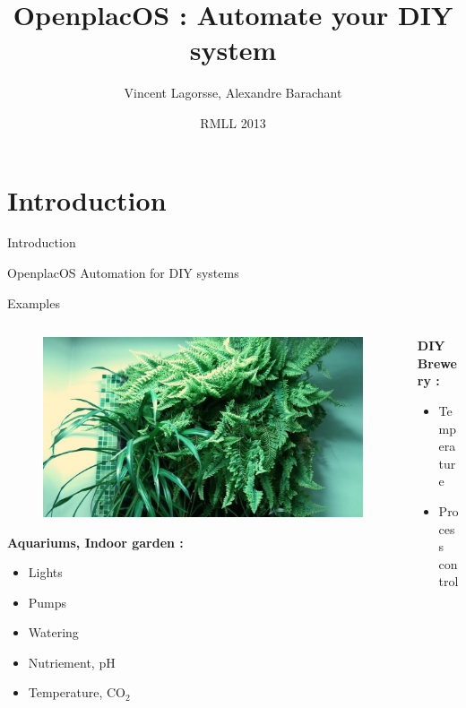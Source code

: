 \documentclass{beamer}
\title[P300 BCI without training]{OpenplacOS : Automate your DIY system}
\author[A. Barachant, V. Lagorsse]{Vincent Lagorsse, Alexandre Barachant}\institute{}
\date{RMLL 2013}
\begin{document}
{
\begin{frame}
  \titlepage
\end{frame}
}
\addtocounter{framenumber}{-1}

\section{Introduction}

\begin{frame}{Introduction}
\begin{block}{OpenplacOS}
Automation for DIY systems
\end{block}
\end{frame}

\begin{frame}{Examples}
\begin{columns}
\begin{column}[l]{0.5\textwidth}
\begin{figure}
\includegraphics[width=\columnwidth]{figures/mur.jpg}
\end{figure}
\vfill
\textbf{Aquariums, Indoor garden :}
\begin{itemize}
\item Lights
\item Pumps
\item Watering
\item Nutriement, pH
\item Temperature, $\mathrm{CO}_2$
\end{itemize}
\end{column}
\begin{column}[r]{0.5\textwidth}
\textbf{DIY Brewery :}
\begin{itemize}
\item Temperature
\item Process control

\end{itemize}
\end{column}
\end{columns}
\end{frame}
\end{document}
